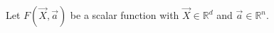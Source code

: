 \documentclass[aps,12pt]{revtex4}
\begin{document}
Let $F(\vec{X},\vec{a})$ be a scalar function with $\vec{X} \in \mathbb{R}^d$ and $\vec{a}\in\mathbb{R}^n$.
\end{document}
